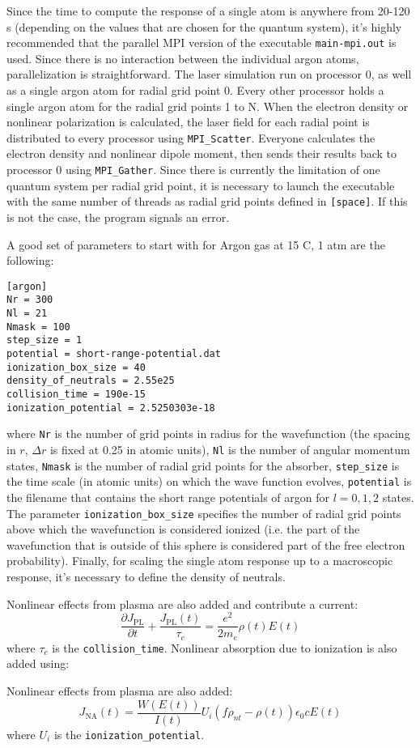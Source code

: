 \documentclass{article}
\begin{document}
Since the time to compute the response of a single atom is anywhere
from 20-120 s (depending on the values that are chosen for the quantum
system), it's highly recommended that the parallel MPI version of the
executable \texttt{main-mpi.out} is used. Since there is no
interaction between the individual argon atoms, parallelization is
straightforward. The laser simulation run on processor 0, as well as a
single argon atom for radial grid point 0. Every other processor holds
a single argon atom for the radial grid points 1 to N.  When the
electron density or nonlinear polarization is calculated, the laser
field for each radial point is distributed to every processor using
\texttt{MPI\_Scatter}. Everyone calculates the electron density and
nonlinear dipole moment, then sends their results back to processor 0
using \texttt{MPI\_Gather}. Since there is currently the limitation of
one quantum system per radial grid point, it is necessary to launch
the executable with the same number of threads as radial grid points
defined in \texttt{[space]}. If this is not the case, the program
signals an error.

A good set of parameters to start with for Argon gas at 15 C, 1 atm
are the following:
\begin{lstlisting}
[argon]
Nr = 300
Nl = 21
Nmask = 100
step_size = 1
potential = short-range-potential.dat
ionization_box_size = 40
density_of_neutrals = 2.55e25
collision_time = 190e-15
ionization_potential = 2.5250303e-18
\end{lstlisting}
where \texttt{Nr} is the number of grid points in radius for the
wavefunction (the spacing in $r$, $\Delta r$ is fixed at 0.25 in
atomic units), \texttt{Nl} is the number of angular momentum states,
\texttt{Nmask} is the number of radial grid points for the absorber,
\texttt{step\_size} is the time scale (in atomic units) on which the
wave function evolves, \texttt{potential} is the filename that
contains the short range potentials of argon for $l=0,1,2$ states. The
parameter \texttt{ionization\_box\_size} specifies the number of
radial grid points above which the wavefunction is considered ionized
(i.e. the part of the wavefunction that is outside of this sphere is
considered part of the free electron probability). Finally, for
scaling the single atom response up to a macroscopic response, it's
necessary to define the density of neutrals.

Nonlinear effects from plasma are also added and contribute a current:
\[\frac{\partial J_{\mathrm{PL}}}{\partial t} + \frac{J_{\mathrm{PL}}(t)}{\tau_c} = \frac{e^2}{2 m_e} \rho(t) E(t)\]
where $\tau_c$ is the \texttt{collision\_time}. Nonlinear absorption
due to ionization is also added using:

Nonlinear effects from plasma are also added:
\[J_{\mathrm{NA}}(t) = \frac{W(E(t))}{I(t)} U_i \left(f\rho_{nt} -
    \rho(t)\right) \epsilon_0 c E(t)\]
where $U_i$ is the \texttt{ionization\_potential}.
\end{document}
